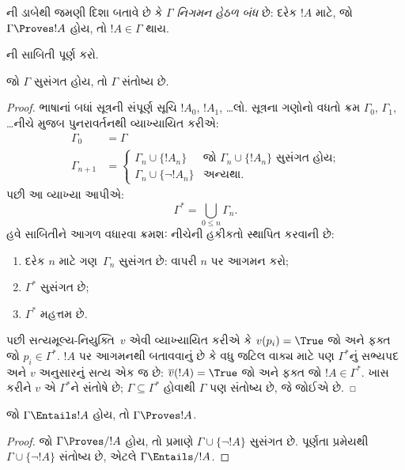 ની ડાબેથી જમણી દિશા
બતાવે છે કે $\Gamma$ \emph{નિગમન હેઠળ બંધ} છે:
દરેક $!A$ માટે, જો $\Gamma \Proves !A$ હોય, તો $!A
\in \Gamma$ થાય.

\begin{prob}
  ની સાબિતી પૂર્ણ કરો.
\end{prob}

\begin{thm}[પૂર્ણતા]
જો $\Gamma$ સુસંગત હોય, તો $\Gamma$ સંતોષ્ય છે.
\end{thm}

\begin{proof}
ભાષાનાં બધાં સૂત્રની સંપૂર્ણ સૂચિ $!A_0$, $!A_1$,
\dots લો. સૂત્રના ગણોનો વધતો ક્રમ
$\Gamma_0$, $\Gamma_1$, \dots નીચે મુજબ પુનરાવર્તનથી વ્યાખ્યાયિત કરીએ:
\begin{align*}
\Gamma_0 & = \Gamma\\
\Gamma_{n+1} &  =
\begin{cases}
  \Gamma_n \cup \{!A_n\} & \text{જો $\Gamma_n \cup \{!A_n\}$ સુસંગત હોય;}\\
  \Gamma_n \cup \{\lnot !A_n\} & \text{અન્યથા}.
\end{cases}
\end{align*}
પછી આ વ્યાખ્યા આપીએ:
\[
\Gamma^* = \bigcup_{0\le n}\Gamma_n.
\]
હવે સાબિતીને આગળ વધારવા ક્રમશઃ નીચેની હકીકતો સ્થાપિત કરવાની છે:
\begin{enumerate}
\item દરેક $n$ માટે ગણ~$\Gamma_n$ સુસંગત છે:
   વાપરી
  $n$ પર આગમન કરો;
\item $\Gamma^*$ સુસંગત છે;
\item $\Gamma^*$ મહત્તમ છે.
\end{enumerate}
પછી સત્યમૂલ્ય-નિયુક્તિ~$v$ એવી વ્યાખ્યાયિત કરીએ કે
$v(p_i) = \True$ જો અને ફક્ત જો $p_i \in \Gamma^*$.
$!A$ પર આગમનથી બતાવવાનું છે કે વધુ જટિલ વાક્ય
માટે પણ $\Gamma^*$નું સભ્યપદ અને $v$ અનુસારનું સત્ય એક જ છે:
$\overline{v}(!A) = \True$ જો અને ફક્ત જો $!A \in \Gamma^*$.
ખાસ કરીને $v$ એ $\Gamma^*$ને સંતોષે છે;
$\Gamma \subseteq \Gamma^*$ હોવાથી $\Gamma$ પણ સંતોષ્ય છે,
જે જોઈએ છે.
\end{proof}

\begin{cor}
જો $\Gamma \Entails !A$ હોય, તો $\Gamma \Proves !A$.
\end{cor}

\begin{proof}
જો $\Gamma\Proves/ !A$ હોય, તો
 પ્રમાણે
$\Gamma \cup \{\lnot !A\}$ સુસંગત છે.
પૂર્ણતા પ્રમેયથી $\Gamma \cup
\{\lnot !A\}$ સંતોષ્ય છે, એટલે $\Gamma \Entails/ !A$.
\end{proof}

